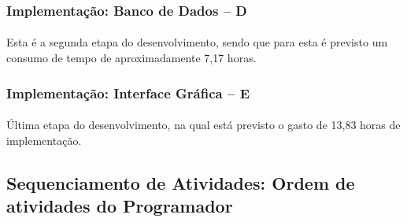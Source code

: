 \documentclass[12pt,a4paper]{article}
\begin{document}
		\subsubsection{Implementação: Banco de Dados -- D}
		\paragraph{} Esta é a segunda etapa do desenvolvimento, sendo que para esta é previsto um consumo de tempo de aproximadamente 7,17 horas. 
		\subsubsection{Implementação: Interface Gráfica -- E}
		\paragraph{} Última etapa do desenvolvimento, na qual está previsto o gasto de 13,83 horas de implementação.
		\subsection{Sequenciamento de Atividades: Ordem de atividades do Programador}
\end{document}
